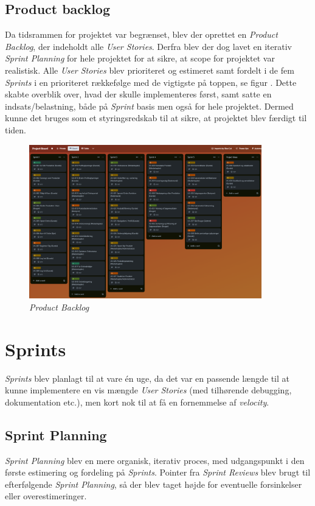 \subsection{Product backlog}
Da tidsrammen for projektet var begrænset, blev der oprettet en \emph{Product Backlog}, der indeholdt alle \emph{User Stories}. Derfra blev der dog lavet en iterativ \emph{Sprint Planning} for hele projektet for at sikre, at scope for projektet var realistisk.
Alle \emph{User Stories} blev prioriteret og estimeret samt fordelt i de fem \emph{Sprints} i en prioriteret rækkefølge med de vigtigste på toppen, se figur . 
Dette skabte overblik over, hvad der skulle implementeres først, samt satte en indsats/belastning, både på \emph{Sprint} basis men også for hele projektet.
Dermed kunne det bruges som et styringsredskab til at sikre, at projektet blev færdigt til tiden.
\begin{figure}[H]
    \centering
    \includegraphics[width=0.9\textwidth]{figures/scrum/trello-sprint-backlogs.png}
    \caption{\emph{Product Backlog}}
    \label{fig:trello-sprint-backlogs}
\end{figure}

\section{Sprints}
\emph{Sprints} blev planlagt til at vare én uge, da det var en passende længde til at kunne implementere en vis mængde \emph{User Stories} (med tilhørende debugging, dokumentation etc.), men kort nok til at få en fornemmelse af \emph{velocity}.

\subsection{Sprint Planning}
\emph{Sprint Planning} blev en mere organisk, iterativ proces, med udgangspunkt i den første estimering og fordeling på \emph{Sprints}. 
Pointer fra \emph{Sprint Reviews} blev brugt til efterfølgende \emph{Sprint Planning}, så der blev taget højde for eventuelle forsinkelser eller overestimeringer.

